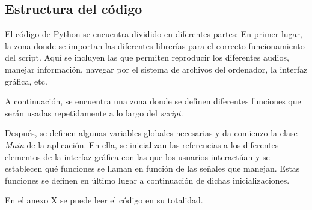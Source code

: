 \documentclass[11pt,a4paper,twoside]{book}
\begin{document}
            \subsection{Estructura del código}
                El código de Python se encuentra dividido en diferentes partes:
                En primer lugar, la zona donde se importan las diferentes librerías para el correcto funcionamiento del script. Aquí se incluyen las que permiten reproducir los diferentes audios, manejar información, navegar por el sistema de archivos del ordenador, la interfaz gráfica, etc.
                
                A continuación, se encuentra una zona donde se definen diferentes funciones que serán usadas repetidamente a lo largo del \textit{script}. 
                
                Después, se definen algunas variables globales necesarias y da comienzo la clase \textit{Main} de la aplicación. En ella, se inicializan las referencias a los diferentes elementos de la interfaz gráfica con las que los usuarios interactúan y se establecen qué funciones se llaman en función de las señales que manejan. Estas funciones se definen en último lugar a continuación de dichas inicializaciones.
                
                En el anexo X se puede leer el código en su totalidad.
               
        
\end{document}
